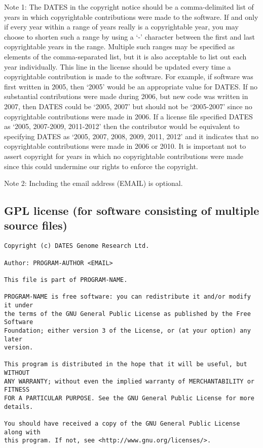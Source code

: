 \documentclass[10pt,a4paper]{article}
\begin{document}
Note 1: The DATES in the copyright notice should be a comma-delimited list of years in which 
copyrightable contributions were made to the software. If and only if every year within a range 
of years really is a copyrightable year, you may choose to shorten such a range by using a `-' 
character between the first and last copyrightable years in the range. Multiple such ranges may 
be specified as elements of the comma-separated list, but it is also acceptable to list out each 
year individually. This line in the license should be updated every time a copyrightable 
contribution is made to the software. For example, if software was first written in 2005, then 
`2005' would be an appropriate value for DATES. If no substantial contributions were made 
during 2006, but new code was written in 2007, then DATES could be `2005, 2007' but should 
not be `2005-2007' since no copyrightable contributions were made in 2006. If a license file 
specified DATES as `2005, 2007-2009, 2011-2012' then the contributor would be equivalent to 
specifying DATES as `2005, 2007, 2008, 2009, 2011, 2012' and it indicates that no copyrightable 
contributions were made in 2006 or 2010. It is important not to assert copyright for years in 
which no copyrightable contributions were made since this could undermine our rights to 
enforce the copyright. 
 
Note 2: Including the email address (EMAIL) is optional. 

\subsection{GPL license (for software consisting of multiple source files)}

\begin{boilerplate}
\begin{verbatim}
Copyright (c) DATES Genome Research Ltd. 
 
Author: PROGRAM-AUTHOR <EMAIL> 

This file is part of PROGRAM-NAME. 

PROGRAM-NAME is free software: you can redistribute it and/or modify it under 
the terms of the GNU General Public License as published by the Free Software 
Foundation; either version 3 of the License, or (at your option) any later 
version. 
 
This program is distributed in the hope that it will be useful, but WITHOUT 
ANY WARRANTY; without even the implied warranty of MERCHANTABILITY or FITNESS 
FOR A PARTICULAR PURPOSE. See the GNU General Public License for more 
details. 
 
You should have received a copy of the GNU General Public License along with 
this program. If not, see <http://www.gnu.org/licenses/>. 
\end{verbatim}
\end{boilerplate}
\end{document}
